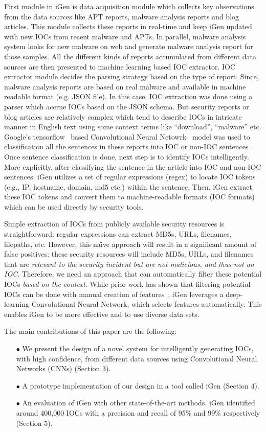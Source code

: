 First module in iGen is data acquisition module which collects key observations from the data sources like APT reports, malware analysis reports and blog articles. This module collects these reports in real-time and keep iGen updated with new IOCs from recent malware and APTs. In parallel, malware analysis system looks for new malware on web and generate malware analysis report for those samples.   All the different kinds of reports accumulated from different data sources are then presented to machine learning based IOC extractor. IOC extractor module decides the parsing strategy based on the type of report. Since, malware analysis reports are based on real malware and available in machine readable format (e.g. JSON file). In this case, IOC extraction was done using a parser which accrue IOCs based on the JSON schema. But security reports or blog articles are relatively complex which tend to describe IOCs in intricate manner in English text using some context terms like ``download'', ``malware'' etc. Google's tensorflow~\cite{abadi} based Convolutional Neural Netowrk~\cite{krizhevsky} model was used to classification all the sentences in these reports into IOC or non-IOC sentences~\cite{bengio,yih,mikolov,collobert}. Once sentence classification is done, next step is to identify IOCs intelligently. More explicitly, after classifying the sentence in the article into IOC and non-IOC sentences. iGen utilizes a set of regular expressions (regex) to locate IOC tokens (e.g., IP, hostname, domain, md5 etc.) within the sentence. Then, iGen extract these IOC tokens and convert them to machine-readable formats (IOC formats) which can be used directly by security tools.

Simple extraction of IOCs from publicly available security resources is straightforward: regular expressions can extract MD5s, URLs, filenames, filepaths, etc. However, this na\"{\i}ve approach will result in a significant amount of false positives: these security resources will include MD5s, URLs, and filenames that are \emph{relevant to the security incident but are not malicious, and thus not an IOC}. Therefore, we need an approach that can automatically filter these potential IOCs \emph{based on the context}.
While prior work has shown that filtering potential IOCs can be done with manual creation of features~\cite{liao}, iGen leverages a deep-learning Convolutional Neural Network, which selects features automatically. This enables iGen to be more effective and to use diverse data sets. 

The main contributions of this paper are the following:
\begin{itemize}
 \item[$\bullet$ ] We present the design of a novel system for intelligently generating IOCs, with high confidence, from different data sources using Convolutional Neural Networks (CNNs) (Section 3). 
  \item[$\bullet$ ] A prototype implementation of our design in a tool called iGen (Section 4).
  \item[$\bullet$ ] An evaluation of iGen with other state-of-the-art methods. iGen identified around 400,000 IOCs with a precision and recall of 95\% and 99\% respectively (Section 5). 
\end{itemize}
